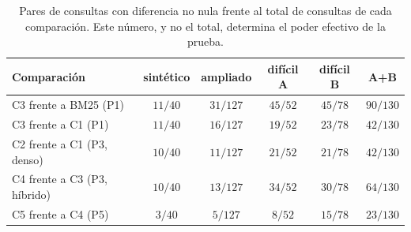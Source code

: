 \begin{table}[htbp]
\centering
\footnotesize
\setlength{\tabcolsep}{5pt}
\renewcommand{\arraystretch}{1.25}
\caption{Pares de consultas con diferencia no nula frente al total de consultas de cada comparación. Este número, y no el total, determina el poder efectivo de la prueba.}
\label{tab:pares}
\begin{tabularx}{\textwidth}{@{}l C C C C C@{}}
\toprule
\textbf{Comparación} & \textbf{sintético} & \textbf{ampliado} & \textbf{difícil A} & \textbf{difícil B} & \textbf{A+B} \\
\midrule
C3 frente a BM25 (P1) & $11/40$ & $31/127$ & $45/52$ & $45/78$ & $90/130$ \\
C3 frente a C1 (P1) & $11/40$ & $16/127$ & $19/52$ & $23/78$ & $42/130$ \\
C2 frente a C1 (P3, denso) & $10/40$ & $11/127$ & $21/52$ & $21/78$ & $42/130$ \\
C4 frente a C3 (P3, híbrido) & $10/40$ & $13/127$ & $34/52$ & $30/78$ & $64/130$ \\
C5 frente a C4 (P5) & $3/40$ & $5/127$ & $8/52$ & $15/78$ & $23/130$ \\
\bottomrule
\end{tabularx}
\end{table}

